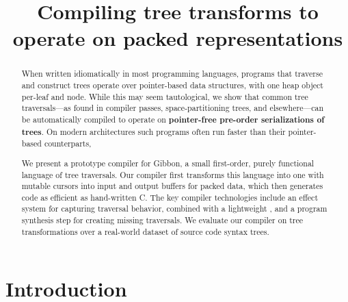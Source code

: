 \documentclass[a4paper,english]{lipics-v2016}
\title{Compiling tree transforms to operate on packed representations}
\author[1]{}
\begin{document}
\maketitle

\begin{abstract}
When written idiomatically in most programming languages, programs that traverse
and construct trees operate over pointer-based data structures, with one heap
object per-leaf and node.  While this may seem tautological, we show that common
tree traversals---as found in compiler passes, space-partitioning trees, and
elsewhere---can  be automatically compiled to operate on \textbf{pointer-free
pre-order serializations of trees}.  On modern architectures such programs
often run  faster than their pointer-based counterparts,

We present a prototype compiler for \textsf{Gibbon}, a small
first-order, purely functional language of tree traversals.  Our
compiler first transforms this language into one with
mutable cursors into input and output buffers
for packed data, which then generates code as efficient as
hand-written C. The key compiler technologies include an effect
system for capturing traversal behavior, combined with a lightweight
, and a program synthesis step for
creating missing traversals. We evaluate our compiler on 
tree transformations over a real-world dataset of source code syntax trees.
  
\end{abstract}




\section{Introduction}

\end{document}
